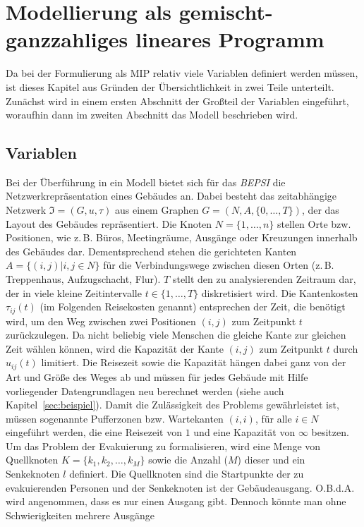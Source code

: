 \documentclass[a4paper, 11pt]{scrreprt}
\begin{document}
\chapter{Modellierung als gemischt-ganzzahliges lineares Programm}
Da bei der Formulierung als MIP relativ viele Variablen definiert werden müssen, ist
dieses Kapitel aus Gründen der Übersichtlichkeit in zwei Teile unterteilt.
Zunächst wird in einem ersten Abschnitt der Großteil der Variablen eingeführt,
woraufhin dann im zweiten Abschnitt das Modell beschrieben wird.

\section{Variablen}
Bei der Überführung in ein Modell bietet sich für das \textit{BEPSI} die
Netzwerkrepräsentation eines Gebäudes an.
Dabei besteht das zeitabhängige Netzwerk $\Im = (G,u,\tau)$ aus einem Graphen
$G = (N,A,\{0,…,T\})$, der das Layout des Gebäudes repräsentiert.
Die Knoten $N = \{1, \dots, n\}$ stellen Orte bzw. Positionen, wie z.\,B. Büros, Meetingräume,
Ausgänge oder Kreuzungen innerhalb des Gebäudes dar. Dementsprechend stehen
die gerichteten Kanten $A = \{(i,j) | i,j \in N\}$ für die Verbindungswege zwischen diesen
Orten (z.\,B. Treppenhaus, Aufzugschacht, Flur). $T$ stellt den zu analysierenden
Zeitraum dar, der in viele kleine Zeitintervalle $t \in \{1, \dots, T\}$ diskretisiert wird.
Die Kantenkosten $\tau_{ij}(t)$ (im Folgenden Reisekosten genannt) entsprechen der Zeit, die benötigt wird,
um den Weg zwischen zwei Positionen $(i, j)$ zum Zeitpunkt $t$ zurückzulegen.
Da nicht beliebig viele Menschen die gleiche Kante zur gleichen Zeit wählen können,
wird die Kapazität der Kante $(i, j)$ zum Zeitpunkt $t$ durch $u_{ij}(t)$ limitiert. Die Reisezeit sowie die
Kapazität hängen dabei ganz von der Art und Größe des Weges ab und müssen für jedes Gebäude mit Hilfe
vorliegender Datengrundlagen neu berechnet werden (siehe auch Kapitel~\ref{sec:beispiel}).
Damit die Zulässigkeit des Problems gewährleistet ist, müssen sogenannte Pufferzonen bzw. Wartekanten
$(i,i)$, für alle $i \in N$ eingeführt werden, die eine Reisezeit von $1$ und eine
Kapazität von $\infty$ besitzen.
Um das Problem der Evakuierung zu formalisieren, wird eine Menge von Quellknoten
$K = \{k_1, k_2,…,k_M\}$ sowie die Anzahl ($M$) dieser und ein Senkeknoten $l$ definiert.
Die Quellknoten sind die Startpunkte der zu evakuierenden Personen und der Senkeknoten ist der Gebäudeausgang.
O.B.d.A. wird angenommen, dass es nur einen Ausgang gibt. Dennoch könnte man ohne Schwierigkeiten mehrere Ausgänge
\end{document}
